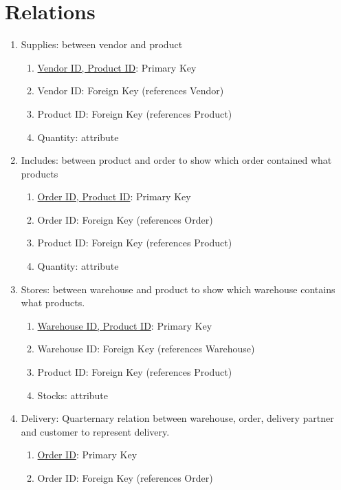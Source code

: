\documentclass[12pt]{report}
\begin{document}
    \section{Relations}
        \begin{enumerate}
             \item Supplies: between vendor and product
            \begin{enumerate}
                \item \underline{Vendor ID, Product ID}: Primary Key
                \item Vendor ID: Foreign Key (references Vendor)
                \item Product ID: Foreign Key (references Product)
                \item Quantity: attribute
            \end{enumerate}
            \item Includes: between product and order to show which order contained what products
            \begin{enumerate}
                \item \underline{Order ID, Product ID}: Primary Key 
                \item Order ID: Foreign Key (references Order)
                \item Product ID: Foreign Key (references Product)
                \item Quantity: attribute
            \end{enumerate}
            \item Stores: between warehouse and product to show which warehouse contains what products.
            \begin{enumerate}
                \item \underline{Warehouse ID, Product ID}: Primary Key
                \item Warehouse ID: Foreign Key (references Warehouse)
                \item Product ID: Foreign Key (references Product)
                \item Stocks: attribute
            \end{enumerate}
            \item Delivery: Quarternary relation between warehouse, order, delivery partner and customer to represent delivery.
            \begin{enumerate}
                \item \underline{Order ID}: Primary Key
                \item Order ID: Foreign Key (references Order)

\end{enumerate}
\end{enumerate}
\end{document}
